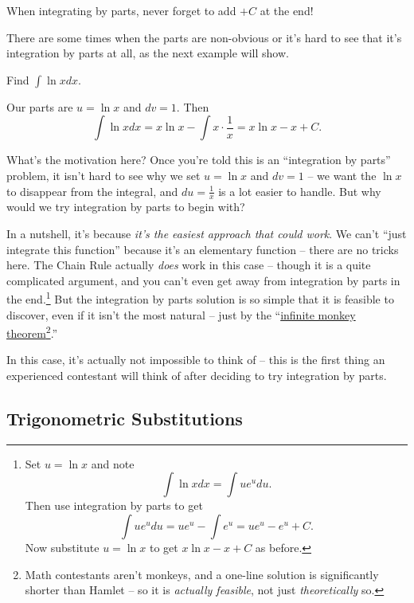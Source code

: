 \documentclass[mast]{lucky}
\begin{document}
\begin{remark}
When integrating by parts, never forget to add $+C$ at the end!
\end{remark}

There are some times when the parts are non-obvious or it's hard to see that it's integration by parts at all, as the next example will show.

\begin{exam}
Find $\int \ln x dx.$
\end{exam}

\begin{sol}
Our parts are $u=\ln x$ and $dv = 1.$ Then
\[\int \ln x dx = x\ln x - \int x\cdot\frac{1}{x} = x\ln x - x + C.\]
\end{sol}

What's the motivation here? Once you're told this is an ``integration by parts'' problem, it isn't hard to see why we set $u=\ln x$ and $dv=1$ -- we want the $\ln x$ to disappear from the integral, and $du=\frac{1}{x}$ is a lot easier to handle. But why would we try integration by parts to begin with?

In a nutshell, it's because \emph{it's the easiest approach that could work}. We can't ``just integrate this function'' because it's an elementary function -- there are no tricks here. The Chain Rule actually \textit{does} work in this case -- though it is a quite complicated argument, and you can't even get away from integration by parts in the end.\footnote{Set $u=\ln x$ and note
\[\int \ln xdx=\int ue^u du.\]
Then use integration by parts to get
\[\int ue^u du = ue^u-\int e^u = ue^u-e^u+C.\]
Now substitute $u=\ln x$ to get $x\ln x-x+C$ as before.} But the integration by parts solution is so simple that it is feasible to discover, even if it isn't the most natural -- just by the ``\href{https://en.wikipedia.org/wiki/Infinite_monkey_theorem}{infinite monkey theorem}\footnote{Math contestants aren't monkeys, and a one-line solution is significantly shorter than Hamlet -- so it is \textit{actually feasible}, not just \textit{theoretically} so.}.''

In this case, it's actually not impossible to think of -- this is the first thing an experienced contestant will think of after deciding to try integration by parts.

\subsection{Trigonometric Substitutions}
\end{document}
